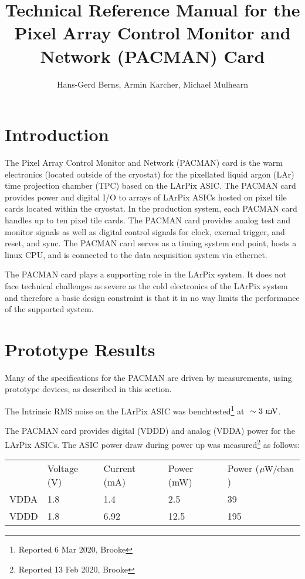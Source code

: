\documentclass[12pt]{article}
\begin{document}
\title{Technical Reference Manual for the Pixel Array Control Monitor
  and Network (PACMAN) Card}
\author{Hans-Gerd Berns, Armin Karcher, Michael Mulhearn}

\maketitle

\section{Introduction}

The Pixel Array Control Monitor and Network (PACMAN) card is the warm
electronics (located outside of the cryostat) for the pixellated
liquid argon (LAr) time projection chamber (TPC) based on the LArPix
ASIC.  The PACMAN card provides power and digital I/O to arrays of
LArPix ASICs hosted on pixel tile cards located within the cryostat.
In the production system, each PACMAN card handles up to ten pixel
tile cards.  The PACMAN card provides analog test and monitor signals
as well as digital control signals for clock, exernal trigger, and
reset, and sync.  The PACMAN card serves as a timing system end point,
hosts a linux CPU, and is connected to the data acquisition system via
ethernet.

The PACMAN card plays a supporting role in the LArPix system.  It does
not face technical challenges as severe as the cold electronics of the
LArPix system and therefore a basic design constraint is that it in no
way limits the performance of the supported system.

\section{Prototype Results}

Many of the specifications for the PACMAN are driven by measurements,
using prototype devices, as described in this section.

The Intrinsic RMS noise on the LArPix ASIC was
benchtested\footnote{Reported 6 Mar 2020, Brooke} at $~\sim 3~\rm mV$.

The PACMAN card provides digital (VDDD) and analog (VDDA) power for
the LArPix ASICs.  The ASIC power draw during power up was
measured\footnote{Reported 13 Feb 2020, Brooke} as follows:
\begin{center}
\begin{tabular}{lllll}
   & Voltage (V) & Current (mA) & Power (mW) & Power ($\rm \mu W / chan$)\\
VDDA  & 1.8 & 1.4  & 2.5  & 39\\
VDDD  & 1.8 & 6.92 & 12.5 & 195\\
\end{tabular}
\end{center}
\end{document}
